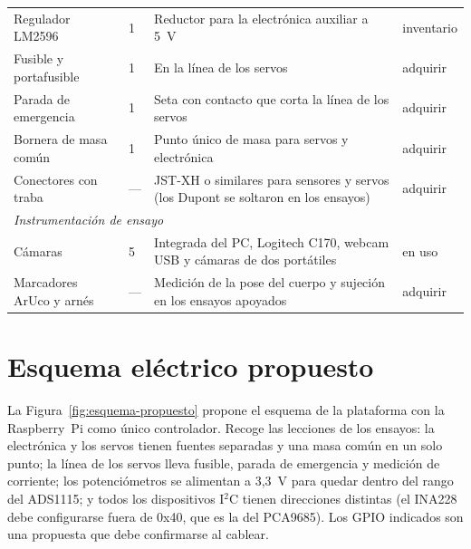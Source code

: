 \begin{longtable}{p{}p{}p{}p{}}
Regulador LM2596 & 1 & Reductor para la electrónica auxiliar a 5~V & inventario \\
Fusible y portafusible & 1 & En la línea de los servos & adquirir \\
Parada de emergencia & 1 & Seta con contacto que corta la línea de los servos & adquirir \\
Bornera de masa común & 1 & Punto único de masa para servos y electrónica & adquirir \\
Conectores con traba & --- & JST-XH o similares para sensores y servos (los Dupont se soltaron en los ensayos) & adquirir \\
\multicolumn{4}{l}{\textit{Instrumentación de ensayo}} \\
Cámaras & 5 & Integrada del PC, Logitech C170, webcam USB y cámaras de dos portátiles & en uso \\
Marcadores ArUco y arnés & --- & Medición de la pose del cuerpo y sujeción en los ensayos apoyados & adquirir \\
\bottomrule
\end{longtable}

\section{Esquema eléctrico propuesto}

La Figura~\ref{fig:esquema-propuesto} propone el esquema de la plataforma con la
Raspberry~Pi como único controlador. Recoge las lecciones de los ensayos: la
electrónica y los servos tienen fuentes separadas y una masa común en un solo
punto; la línea de los servos lleva fusible, parada de emergencia y medición de
corriente; los potenciómetros se alimentan a 3,3~V para quedar dentro del rango
del ADS1115; y todos los dispositivos I$^2$C tienen direcciones distintas (el
INA228 debe configurarse fuera de 0x40, que es la del PCA9685). Los GPIO
indicados son una propuesta que debe confirmarse al cablear.

